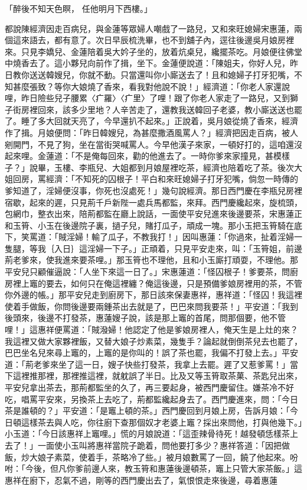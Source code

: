 \begin{showcontents}{}
「醉後不知天色瞑，  任他明月下西樓。」

都說陳經濟因走百病兒，與金蓮等眾婦人嘲戲了一路兒，又和來旺媳婦宋惠蓮，兩個這來語去，都有意了。次日早辰梳洗畢，也不到舖子內，逕往後邊吳月娘房裡來。只見李嬌兒、金蓮陪着吳大妗子坐的，放着炕桌兒，纔擺茶吃。月娘便往佛堂中燒香去了。這小夥兒向前作了揖，坐下。金蓮便說道：「陳姐夫，你好人兒，昨日教你送送韓嫂兒，你就不動。只當還叫你小廝送去了！且和媳婦子打牙犯嘴，不知甚麼張致？等你大娘燒了香來，看我對他說不說！」經濟道：「你老人家還說哩，昨日險些兒子腰累〈疒羅〉〈疒里〉了哩！跟了你老人家走了一路兒，又到獅子街房裡回來，該多少里地？人辛苦走了，還教我送韓回子老婆，教小廝送送也罷了。睡了多大回就天亮了，今早還扒不起來。」正說着，吳月娘從燒了香來，經濟作了揖。月娘便問：「昨日韓嫂兒，為甚麼撒酒風罵人？」經濟把因走百病，被人剜開門，不見了狗，坐在當街哭喊罵人。今早他漢子來家，一頓好打的，這咱還沒起來哩。金蓮道：「不是俺每回來，勸的他進去了。一時你爹來家撞見，甚模樣子？」說畢，玉樓、李瓶兒、大姐都到月娘屋裡吃茶，經濟也陪着吃了茶。後次大姐回房，罵經濟：「不知死的囚根子！平白和來旺媳婦子打牙犯嘴，倘忽一時傳的爹知道了，淫婦便沒事，你死也沒處死！」幾句說經濟。那日西門慶在李瓶兒房裡宿歇，起來的遲，只見荊千戶新陛一處兵馬都監，來拜。西門慶纔起來，旋梳頭，包網巾，整衣出來，陪荊都監在廳上說話，一面使平安兒進來後邊要茶，宋惠蓮正和玉筲、小玉在後邊院子裏，撾子兒，賭打瓜子，頑成一塊。那小玉把玉筲騎在底下，笑罵道：「賊淫婦！輸了瓜子，不教我打！」因叫惠蓮：「你過來，扯着淫婦一隻腿，等我｛入日｝這淫婦一下子。」正頑着，只見平安走來，叫：「玉筲姐，前邊荊老爹來，使我進來要茶哩。」那玉筲也不理他，且和小玉廝打頑耍，不理他。那平安兒只顧催逼說：「人坐下來這一日了。」宋惠蓮道：「怪囚根子！爹要茶，問廚房裡上竈的要去，如何只在俺這裡纏？俺這後邊，只是預備爹娘房裡用的茶，不管你外邊的帳。」那平安兒走到廚房下，那日該來保妻惠祥，惠祥道：「怪囚！我這裡使着手做飯，你問後邊要兩鍾茶出去就是了，巴巴來問我要茶！」平安道：「我到後頭來，後邊不打發茶，惠蓮嫂子說，該是那上竈的首尾，問那個要，他不管哩！」這惠祥便罵道：「賊潑婦！他認定了他是爹娘房裡人，俺天生是上灶的來？我這裡又做大家夥裡飯，又替大娘子炒素菜，幾隻手？論起就倒倒茶兒去也罷了，巴巴坐名兒來尋上竈的，上竈的是你叫的！誤了茶也罷，我偏不打發上去。」平安道：「荊老爹來坐了這一日，嫂子快些打發茶，我拿上去罷。遲了又惹爹罵！」當下這裡推那裡，那裡推這裡，就躭誤了半日。比及又等玉筲取茶菓、茶匙兒出來，平安兒拿出茶去，那荊都監坐的久了，再三要起身，被西門慶留住。嫌茶冷不好吃，唱罵平安來，另換茶上去吃了，荊都監纔起身去了。西門慶進來，問：「今日茶是誰頓的？」平安道：「是竈上頓的茶。」西門慶回到月娘上房，告訴月娘：「今日頓這樣茶去與人吃，你往廚下查那個奴才老婆上竈？採出來問他，打與他幾下。」小玉道：「今日該惠祥上竈哩。」慌的月娘說道：「這歪辣骨待死！越發頓恁樣茶上去了！」一面使小玉叫將惠祥當院子跪着，問他要打多少？惠祥答道：「因把做飯，炒大娘子素菜，使着手，茶略冷了些。」被月娘數罵了一回，饒了他起來。吩咐：「今後，但凡你爹前邊人來，教玉筲和惠蓮後邊頓茶，竈上只管大家茶飯。」這惠祥在廚下，忍氣不過，剛等的西門慶出去了，氣恨恨走來後邊，尋着惠蓮
\end{showcontents}
